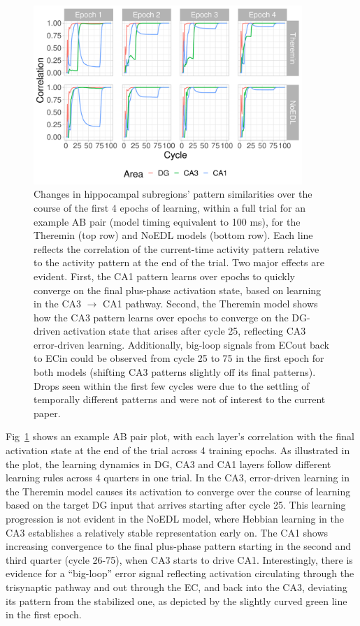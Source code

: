 \documentclass[11pt,twoside]{article}
\newif\myifpdf
\begin{document}
\begin{figure}
  \centering\includegraphics[width=4in]{fig_hip_edl_pat_sim}
  \caption{\footnotesize Changes in hippocampal subregions' pattern similarities over the course of the first 4 epochs of learning, within a full trial for an example AB pair (model timing equivalent to 100 ms), for the Theremin (top row) and NoEDL models (bottom row).  Each line reflects the correlation of the current-time activity pattern relative to the activity pattern at the end of the trial.  Two major effects are evident.  First, the CA1 pattern learns over epochs to quickly converge on the final plus-phase activation state, based on learning in the CA3 $\rightarrow$ CA1 pathway.  Second, the Theremin model shows how the CA3 pattern learns over epochs to converge on the DG-driven activation state that arises after cycle 25, reflecting CA3 error-driven learning.  Additionally, big-loop signals from ECout back to ECin could be observed from cycle 25 to 75 in the first epoch for both models (shifting CA3 patterns slightly off its final patterns).  Drops seen within the first few cycles were due to the settling of temporally different patterns and were not of interest to the current paper.}
\label{fig.pat_sim}
\end{figure}

Fig~\ref{fig.pat_sim} shows an example AB pair plot, with each layer's correlation with the final activation state at the end of the trial across 4 training epochs.  As illustrated in the plot, the learning dynamics in DG, CA3 and CA1 layers follow different learning rules across 4 quarters in one trial.  In the CA3, error-driven learning in the Theremin model causes its activation to converge over the course of learning based on the target DG input that arrives starting after cycle 25.  This learning progression is not evident in the NoEDL model, where Hebbian learning in the CA3 establishes a relatively stable representation early on.  The CA1 shows increasing convergence to the final plus-phase pattern starting in the second and third quarter (cycle 26-75), when CA3 starts to drive CA1.  Interestingly, there is evidence for a ``big-loop'' error signal \citep{KumaranMcClelland12} reflecting activation circulating through the trisynaptic pathway and out through the EC, and back into the  CA3, deviating its pattern from the stabilized one, as depicted by the slightly curved green line in the first epoch.
\end{document}
